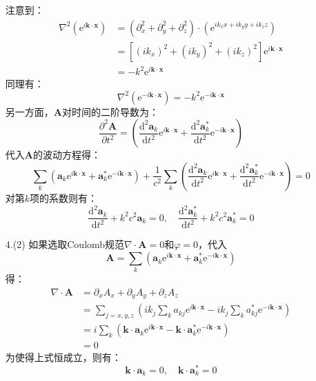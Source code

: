 \documentclass[a4paper,fontset=none]{ctexart}
\begin{document}
\begin{itemize}
        注意到：
        \begin{align*}
            \nabla^2(\mathrm{e}^{i\bm{k}\cdot\bm{x}})
            &= (\partial_x^2 + \partial_y^2 + \partial_z^2) \cdot \left(\mathrm{e}^{ik_x x + ik_y y + ik_z z}\right) \\
            &= \left[(ik_x)^2 + (ik_y)^2 + (ik_z)^2\right]\mathrm{e}^{i\bm{k}\cdot\bm{x}} \\
            &= -k^2\mathrm{e}^{i\bm{k}\cdot\bm{x}}
        \end{align*}
        同理有：
        \[
            \nabla^2(\mathrm{e}^{-i\bm{k}\cdot\bm{x}}) = -k^2\mathrm{e}^{-i\bm{k}\cdot\bm{x}}
        \]
        另一方面，$\bm{A}$对时间的二阶导数为：
        \[
            \frac{\partial^2\bm{A}}{\partial t^2} = \left(\frac{\mathrm{d}^2\bm{a}_k}{\mathrm{d}t^2}\mathrm{e}^{i\bm{k}\cdot\bm{x}} + \frac{\mathrm{d}^2\bm{a}_k^*}{\mathrm{d}t^2}\mathrm{e}^{-i\bm{k}\cdot\bm{x}}\right)
        \]
        代入$\bm{A}$的波动方程得：
        \[
            \sum_k \left(\bm{a}_k\mathrm{e}^{i\bm{k}\cdot\bm{x}} + \bm{a}_k^*\mathrm{e}^{-i\bm{k}\cdot\bm{x}}\right) + \frac{1}{c^2}\sum_k \left(\frac{\mathrm{d}^2\bm{a}_k}{\mathrm{d}t^2}\mathrm{e}^{i\bm{k}\cdot\bm{x}} + \frac{\mathrm{d}^2\bm{a}_k^*}{\mathrm{d}t^2}\mathrm{e}^{-i\bm{k}\cdot\bm{x}}\right) = 0
        \]
        对第$k$项的系数则有：
        \[
            \frac{\mathrm{d}^2\bm{a}_k}{\mathrm{d}t^2} + k^2c^2\bm{a}_k = 0,\quad \frac{\mathrm{d}^2\bm{a}_k^*}{\mathrm{d}t^2} + k^2c^2\bm{a}_k^* = 0
        \]

        \item[4.(2)]
        如果选取Coulomb规范$\nabla\cdot\bm{A}=0$和$\varphi=0$，代入
        \[
            \bm{A} = \sum_k \left(\bm{a}_k\mathrm{e}^{i\bm{k}\cdot\bm{x}} + \bm{a}_k^*\mathrm{e}^{-i\bm{k}\cdot\bm{x}}\right)
        \]
        得：
        \begin{align*}
            \nabla \cdot \bm{A}
            &= \partial_x A_x + \partial_y A_y + \partial_z A_z \\
            &= \sum_{j=x,y,z} \left(ik_j\sum_k a_{kj}\mathrm{e}^{i\bm{k}\cdot\bm{x}} - ik_j\sum_k a_{kj}^*\mathrm{e}^{-i\bm{k}\cdot\bm{x}}\right) \\
            &= i \sum_k \left(\bm{k}\cdot\bm{a}_k\mathrm{e}^{i\bm{k}\cdot\bm{x}} - \bm{k}\cdot\bm{a}_k^*\mathrm{e}^{-i\bm{k}\cdot\bm{x}}\right) \\
            &= 0
        \end{align*}
        为使得上式恒成立，则有：
        \[
            \bm{k} \cdot \bm{a}_k = 0,\quad \bm{k} \cdot \bm{a}_k^* = 0
        \]


\end{itemize}
\end{document}
